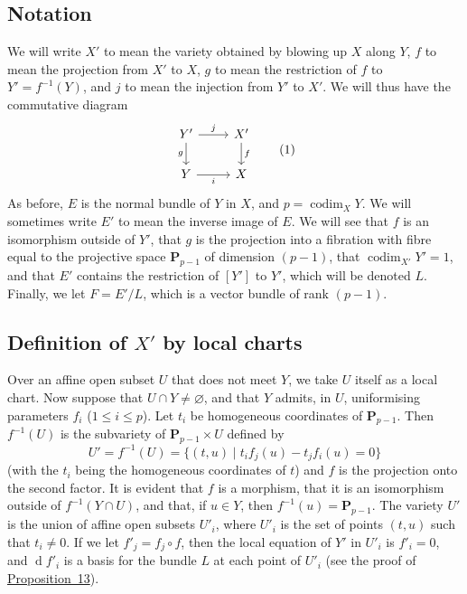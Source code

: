 \documentclass{article}
\theoremstyle{plain}
\theoremstyle{definition}
\newcommand{\PP}{\mathbf{P}}
\newcommand{\dd}{\operatorname{d}\!}
\renewcommand{\leq}{\leqslant}
\DeclareMathOperator{\codim}{codim}
\newcommand{\oldpage}[1]{\marginpar{\footnotesize$\Big\vert$ \textit{p.~#1}}}
\begin{document}
\subsection{Notation}
\label{section12a}

We will write $X'$ to mean the variety obtained by blowing up $X$ along $Y$, $f$ to mean the projection from $X'$ to $X$, $g$ to mean the restriction of $f$ to $Y'=f^{-1}(Y)$, and $j$ to mean the injection from $Y'$ to $X'$.
We will thus have the commutative diagram
\[
\label{section12aequation1}
  \begin{tikzcd}
    Y' \rar["j"] \dar[swap,"g"]
    & X' \dar["f"]
  \\ Y \rar[swap,"i"]
    & X
  \end{tikzcd}
  \tag{1}
\]
As before, $E$ is the normal bundle of $Y$ in $X$, and $p=\codim_XY$.
We will sometimes write $E'$ to mean the inverse image of $E$.
We will see that $f$ is an isomorphism outside of $Y'$, that $g$ is the projection into a fibration
\oldpage{126}
with fibre equal to the projective space $\PP_{p-1}$ of dimension $(p-1)$, that $\codim_{X'}Y'=1$, and that $E'$ contains the restriction of $[Y']$ to $Y'$, which will be denoted $L$.
Finally, we let $F=E'/L$, which is a vector bundle of rank $(p-1)$.


\subsection{Definition of \texorpdfstring{$X'$}{X'} by local charts}
\label{subsection12b}

Over an affine open subset $U$ that does not meet $Y$, we take $U$ itself as a local chart.
Now suppose that $U\cap Y\neq\varnothing$, and that $Y$ admits, in $U$, uniformising parameters $f_i$ ($1\leq i\leq p$).
Let $t_i$ be homogeneous coordinates of $\PP_{p-1}$.
Then $f^{-1}(U)$ is the subvariety of $\PP_{p-1}\times U$ defined by
\[
  U' = f^{-1}(U) = \big\{(t,u) \mid t_if_j(u)-t_jf_i(u)=0\big\}
\]
(with the $t_i$ being the homogeneous coordinates of $t$) and $f$ is the projection onto the second factor.
It is evident that $f$ is a morphism, that it is an isomorphism outside of $f^{-1}(Y\cap U)$, and that, if $u\in Y$, then $f^{-1}(u)=\PP_{p-1}$.
The variety $U'$ is the union of affine open subsets $U'_i$, where $U'_i$ is the set of points $(t,u)$ such that $t_i\neq 0$.
If we let $f'_j=f_j\circ f$, then the local equation of $Y'$ in $U'_i$ is $f'_i=0$, and $\dd f'_i$ is a basis for the bundle $L$ at each point of $U'_i$ (see the proof of \hyperref[proposition13]{Proposition~13}).
\end{document}
